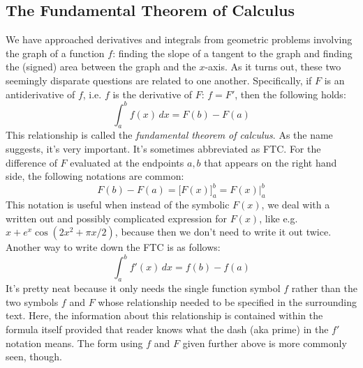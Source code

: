 %



\subsection{The Fundamental Theorem of Calculus}
We have approached derivatives and integrals from geometric problems involving the graph of a function $f$: finding the slope of a tangent to the graph and finding the (signed) area between the graph and the $x$-axis. As it turns out, these two seemingly disparate questions are related to one another. Specifically, if $F$ is an antiderivative of $f$, i.e. $f$ is the derivative of $F$: $f = F'$, then the following holds:
\begin{equation}
 \int_a^b f(x) \, dx = F(b) - F(a)
\end{equation}
This relationship is called the \emph{fundamental theorem of calculus}. As the name suggests, it's very important. It's sometimes abbreviated as FTC. For the difference of $F$ evaluated at the endpoints $a,b$ that appears on the right hand side, the following notations are common:
\begin{equation}
 F(b) - F(a) = \Big[ F(x) \Big]_a^b = F(x) \bigg\rvert_a^b
\end{equation}
This notation is useful when instead of the symbolic $F(x)$, we deal with a written out and possibly complicated expression for $F(x)$, like e.g. $x + e^x \cos(2 x^2 + \pi x /2 )$, because then we don't need to write it out twice. Another way to write down the FTC is as follows:
\begin{equation}
 \int_a^b f'(x) \, dx = f(b) - f(a)
\end{equation}
It's pretty neat because it only needs the single function symbol $f$ rather than the two symbols $f$ and $F$ whose relationship needed to be specified in the surrounding text. Here, the information about this relationship is contained within the formula itself provided that reader knows what the dash (aka prime) in the $f'$ notation means. The form using $f$ and $F$ given further above is more commonly seen, though.

